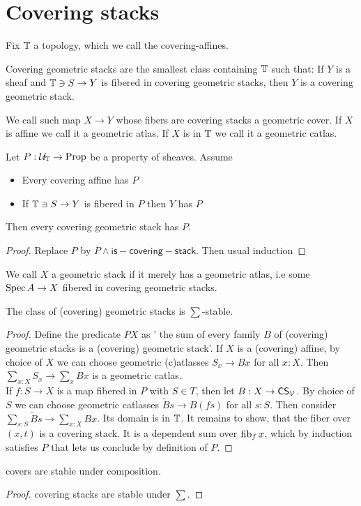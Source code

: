 
\section{Covering stacks}
Fix $\mathbb{T}$ a topology, which we call the covering-affines.
\begin{definition}
	Covering geometric stacks are the smallest class containing $\mathbb{T}$ such that: If $Y$ is a sheaf and $\mathbb{T} \ni S \to Y$ is fibered in covering geometric stacks, then $Y$ is a covering geometric stack.	
\end{definition}
We call such map $X \to Y$ whose fibers are covering stacks a geometric cover. If $X$ is affine we call it a geometric atlas. If $X$ is in $\mathbb{T}$ we call it a geometric catlas. 

\begin{prop}
	Let $P : \mathcal{U}_{\mathbb{T}} \to \operatorname{Prop}$ be a property of sheaves. Assume
	\begin{itemize}
		\item Every covering affine has $P$
		\item If $\mathbb{T} \ni S \to Y$ is fibered in $P$ then $Y$ has $P$
	\end{itemize}
	Then every covering geometric stack has $P$.
\end{prop}
\begin{proof}
	Replace $P$ by $P \land \mathsf{is-covering-stack}$. Then usual induction
	
\end{proof}
\begin{definition}
	We call $X$ a geometric stack if it merely has a geometric atlas, i.e some $\operatorname{Spec} A \to X$ fibered in covering geometric stacks.
\end{definition}

\begin{lemma}
	The class of (covering) geometric stacks is $\sum$-stable.
\end{lemma}
\begin{proof}
	Define the predicate $P X$ as ' the sum of every family $B$ of (covering) geometric stacks is a (covering) geometric stack'.
	If $X$ is a (covering) affine, by choice of $X$ we can choose geometric (c)atlasses $S_x \to B x$ for all $x : X$. Then $\sum_{x :X } S_x \to \sum_x B x$ is a geometric catlas. \\
	If $f : S \to X$ is a map fibered in $P$ with $S \in T$, then let $B : X \to \mathsf{CS}_{\mathcal{V}}$. By choice of $S$ we can choose geometric catlasses $\tilde B s \to B (f s)$ for all $s : S$. Then consider $\sum_{s : S} \tilde B s \to \sum_{x : X} B x$. Its domain is in $\mathbb{T}$. It remains to show, that the fiber over $(x,t)$ is a covering stack. It is a dependent sum over $\operatorname{fib}_f x$, which by induction satisfies $P$ that lets us conclude by definition of $P$.
\end{proof}
\begin{lemma}{\label{lemma:coversstableundercomp}}
	covers are stable under composition.
\end{lemma}
\begin{proof}
	covering stacks are stable under $\sum$.
\end{proof}

